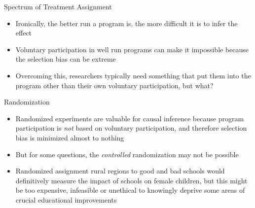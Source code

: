 \documentclass{beamer}
\begin{document}
\begin{frame}{Spectrum of Treatment Assignment}

\begin{itemize}

\item Ironically, the better run a program is, the more difficult it is to infer the effect 
\item Voluntary participation in well run programs can make it impossible because the selection bias can be extreme
\item Overcoming this, researchers typically need something that put them into the program other than their own voluntary participation, but what?

\end{itemize}

\end{frame}




\begin{frame}{Randomization}
\begin{center}
\end{center}

\bigskip

\begin{itemize}
\item Randomized experiments are valuable for causal inference because program participation is \emph{not} based on voluntary participation, and therefore selection bias is minimized almost to nothing
\item But for some questions, the \emph{controlled} randomization may not be possible 
\item Randomized assignment rural regions to good and bad schools would definitively measure the impact of schools on female children, but this might be too expensive, infeasible or unethical to knowingly deprive some areas of crucial educational improvements
\end{itemize}



\end{frame}
\end{document}
